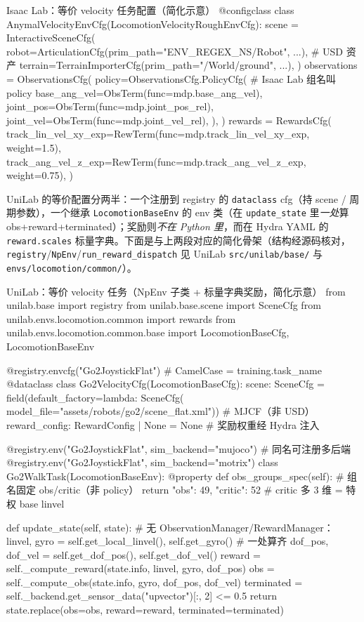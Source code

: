 \begin{codebox}[Python]{Isaac Lab：等价 velocity 任务配置（简化示意）}
@configclass
class AnymalVelocityEnvCfg(LocomotionVelocityRoughEnvCfg):
    scene = InteractiveSceneCfg(
        robot=ArticulationCfg(prim_path="{ENV_REGEX_NS}/Robot", ...),  # USD 资产
        terrain=TerrainImporterCfg(prim_path="/World/ground", ...),
    )
    observations = ObservationsCfg(
        policy=ObservationsCfg.PolicyCfg(                  # Isaac Lab 组名叫 policy
            base_ang_vel=ObsTerm(func=mdp.base_ang_vel),
            joint_pos=ObsTerm(func=mdp.joint_pos_rel),
            joint_vel=ObsTerm(func=mdp.joint_vel_rel),
        ),
    )
    rewards = RewardsCfg(
        track_lin_vel_xy_exp=RewTerm(func=mdp.track_lin_vel_xy_exp, weight=1.5),
        track_ang_vel_z_exp=RewTerm(func=mdp.track_ang_vel_z_exp, weight=0.75),
    )
\end{codebox}

UniLab 的等价配置分两半：一个注册到 registry 的 \verb|dataclass| cfg（持 scene / 周期参数），一个继承 \verb|LocomotionBaseEnv| 的 env 类（在 \verb|update_state| 里\emph{一处}算 obs+reward+terminated）；奖励则\emph{不在 Python 里}，而在 Hydra YAML 的 \verb|reward.scales| 标量字典。下面是与上两段对应的简化骨架（结构经源码核对，\verb|registry|/\verb|NpEnv|/\verb|run_reward_dispatch| 见 UniLab \verb|src/unilab/base/| 与 \verb|envs/locomotion/common/|）。

\begin{codebox}[Python]{UniLab：等价 velocity 任务（NpEnv 子类 + 标量字典奖励，简化示意）}
from unilab.base import registry
from unilab.base.scene import SceneCfg
from unilab.envs.locomotion.common import rewards
from unilab.envs.locomotion.common.base import LocomotionBaseCfg, LocomotionBaseEnv

@registry.envcfg("Go2JoystickFlat")               # CamelCase = training.task_name
@dataclass
class Go2VelocityCfg(LocomotionBaseCfg):
    scene: SceneCfg = field(default_factory=lambda: SceneCfg(
        model_file="assets/robots/go2/scene_flat.xml"))   # MJCF（非 USD）
    reward_config: RewardConfig | None = None     # 奖励权重经 Hydra 注入

@registry.env("Go2JoystickFlat", sim_backend="mujoco")    # 同名可注册多后端
@registry.env("Go2JoystickFlat", sim_backend="motrix")
class Go2WalkTask(LocomotionBaseEnv):
    @property
    def obs_groups_spec(self):                    # 组名固定 obs/critic（非 policy）
        return {"obs": 49, "critic": 52}          # critic 多 3 维 = 特权 base linvel

    def update_state(self, state):                # 无 ObservationManager/RewardManager：
        linvel, gyro = self.get_local_linvel(), self.get_gyro()   # 一处算齐
        dof_pos, dof_vel = self.get_dof_pos(), self.get_dof_vel()
        reward = self._compute_reward(state.info, linvel, gyro, dof_pos)
        obs = self._compute_obs(state.info, gyro, dof_pos, dof_vel)
        terminated = self._backend.get_sensor_data("upvector")[:, 2] <= 0.5
        return state.replace(obs=obs, reward=reward, terminated=terminated)
\end{codebox}

